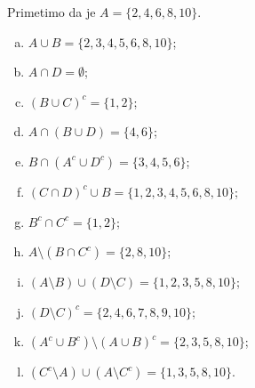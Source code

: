 {
Primetimo da je $A=\{2,4,6,8,10\}$.
\begin{enumerate}[(a)]
\item $A \cup B=\{ 2,3,4,5,6,8,10 \}$;
\item $A \cap D=  \emptyset$;
\item $(B \cup C)^c=\{ 1,2 \}$;
\item $A \cap (B \cup D)=\{ 4,6\}$;
\item $B \cap(A^c \cup D^c)=\{3, 4, 5, 6\}$; %
\item $(C \cap D)^c \cup B=\{ 1, 2, 3, 4, 5, 6, 8, 10\}$;
\item $B^c\cap C^c=\{ 1,2 \}$;
\item $A \setminus (B \cap C^c)=\{ 2, 8, 10 \}$;
\item $(A \setminus B)\cup (D \setminus C)=\{ 1, 2, 3, 5, 8, 10 \}$;
\item $(D \setminus C)^c=\{ 2, 4, 6, 7, 8, 9, 10 \}$;
\item $( A^c \cup B^c) \setminus (A \cup B)^c=\{ 2, 3, 5, 8, 10 \}$;
\item $(C^c \setminus A)\cup (A \setminus C^c)=\{1, 3, 5, 8, 10 \}$. %
\end{enumerate}

}
